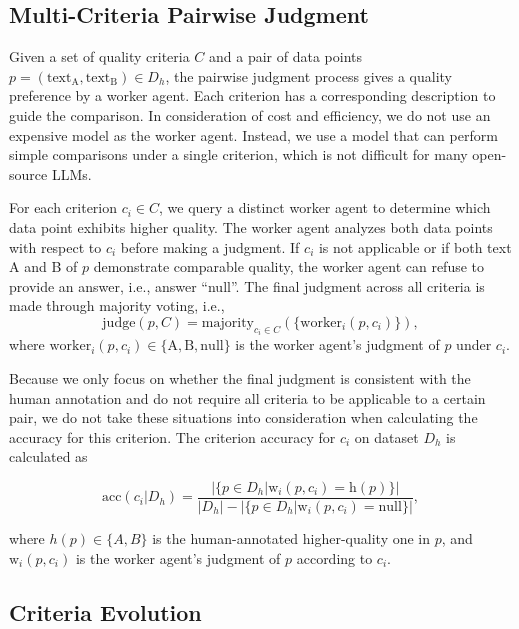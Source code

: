 \subsection{Multi-Criteria Pairwise Judgment}
\label{sec:voting}

Given a set of quality criteria $C$ and a pair of data points $p=(\text{text}_{\text{A}}
, \text{text}_{\text{B}}) \in D_{h}$, the pairwise judgment process gives a
quality preference by a worker agent. Each criterion has a corresponding description
to guide the comparison. In consideration of cost and efficiency, we do not use an
expensive model as the worker agent. Instead, we use a model that can perform simple
comparisons under a single criterion, which is not difficult for many open-source
LLMs.

For each criterion $c_{i}\in C$, we query a distinct worker agent to determine which
data point exhibits higher quality. The worker agent analyzes both data points
with respect to $c_{i}$ before making a judgment. If $c_{i}$ is not applicable or
if both text A and B of $p$ demonstrate comparable quality, the worker agent can
refuse to provide an answer, i.e., answer ``null''. The final judgment across all
criteria is made through majority voting, i.e.,
\[
    \text{judge}(p, C) = \text{majority}_{c_{i} \in C}(\{\text{worker}_{i}(p, c_{i}
    )\}),
\]
where $\text{worker}_{i}(p, c_{i}) \in \{\text{A}, \text{B}, \text{null}\}$ is
the worker agent's judgment of $p$ under $c_{i}$.

Because we only focus on whether the final judgment is consistent with the human
annotation and do not require all criteria to be applicable to a certain pair, we
do not take these situations into consideration when calculating the accuracy for
this criterion. The criterion accuracy for $c_{i}$ on dataset $D_{h}$ is
calculated as

\begin{footnotesize}
    \[
        \text{acc}(c_{i}|D_{h}) = \frac{|\{p \in D_{h}|\text{w}_{i}(p,c_{i})=\text{h}(p)\}|}{|D_{h}|-|\{p
        \in D_{h}|\text{w}_{i}(p,c_{i})=\text{null}\}|},
    \]
\end{footnotesize}

where $h(p) \in \{A, B\}$ is the human-annotated higher-quality one in $p$, and $\text{w}_{i}
(p,c_{i})$ is the worker agent's judgment of $p$ according to $c_{i}$.

\subsection{Criteria Evolution}

